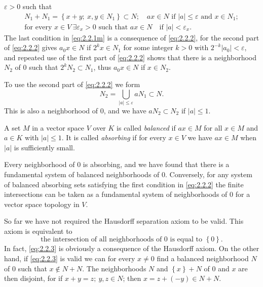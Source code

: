 $\varepsilon>0$ such that
\begin{equation}
  \label{eq:2.2.2}
  \begin{gathered}
    N_1+N_1=\left\{ x+y;\ x,y\in N_1 \right\}\subset N;\quad ax\in
    N\text{ if }|a|\leq\varepsilon\text{ and }x\in N_1;\\
    \text{for every }x\in V\ \exists\varepsilon_x>0\text{ such that }ax\in
    N \quad\text{if }|a|<\varepsilon_x.
  \end{gathered}
\end{equation}
The last condition in \ref{eq:2.2.1m} is a consequence of
\eqref{eq:2.2.2}, for the second part of \eqref{eq:2.2.2} gives
$a_0x\in N$ if $2^kx\in N_1$ for some integer $k>0$ with
$2^{-k}|a_0|<\varepsilon$, and repeated use of the first part of
\eqref{eq:2.2.2} shows that there is a neighborhood $N_2$ of $0$ such
that $2^kN_2\subset N_1$, thus $a_0x\in N$ if $x\in N_2$.

To use the second part of \eqref{eq:2.2.2} we form
\begin{displaymath}
  N_2=\bigcup_{|a|\leq\varepsilon}aN_1\subset N.
\end{displaymath}
This is also a neighborhood of $0$, and we have $aN_2\subset N_2$ if
$|a|\leq1$.
\begin{dfn}
  A set $M$ in a vector space $V$ over $K$ is called \emph{balanced}
  if $ax\in M$ for all $x\in M$ and $a\in K$ with $|a|\leq1$. It is
  called \emph{absorbing} if for every $x\in V$ we have $ax\in M$ when
  $|a|$ is sufficiently small.
\end{dfn}
Every neighborhood of $0$ is absorbing, and we have found that there
is a fundamental system of balanced neighborhoods of $0$. Conversely,
for any system of balanced absorbing sets satisfying the first
condition in \eqref{eq:2.2.2} the finite intersections can be taken as
a fundamental system of neighborhoods of $0$ for a vector space
topology in $V$.

So far we have not required the Hausdorff separation axiom to be
valid. This axiom is equivalent to
\begin{equation}
  \label{eq:2.2.3}
  \text{the intersection of all neighborhoods of }0\text{ is equal to }\left\{ 0 \right\}.
\end{equation}
In fact, \eqref{eq:2.2.3} is obviously a consequence of the Hausdorff
axiom. On the other hand, if \eqref{eq:2.2.3} is valid we can for
every $x\neq0$ find a balanced neighborhood $N$ of $0$ such that
$x\notin N+N$. The neighborhoods $N$ and $\left\{ x \right\}+N$ of $0$
and $x$ are then disjoint, for if $x+y=z;\ y,z\in N$; then $x=z+(-y)\in
N+N$.

